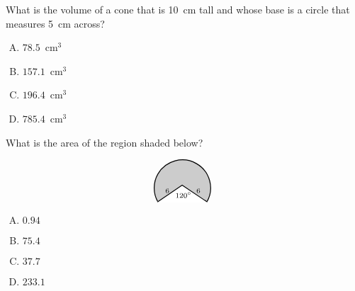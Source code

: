 \documentclass[12pt,letterpaper]{exam}
\begin{document}
\begin{questions}
\question What is the volume of a cone that is 10~cm tall and whose base is a circle that measures 5~cm across?
        \begin{enumerate}[A.]
        \item $78.5$~cm$^3$
        \item $157.1$~cm$^3$
        \item $196.4$~cm$^3$
        \item $785.4$~cm$^3$
        \end{enumerate}



\vfill



\question What is the area of the region shaded below?
	\[
	\begin{tikzpicture}
	\draw[line width=0.03cm,fill=gray!40] (0,0) arc (-30:210:1);
	\draw[line width=0.03cm,fill=white,white] (-1.75,0) -- (-0.875,0.6) -- (0.017,0) -- (-1.75,0);
	\draw[line width=0.03cm] (-1.75,0) -- (-0.875,0.6) -- (0.017,0);
	\node at (-0.3,0.4) {\scriptsize$6$};
	\node at (-1.4,0.4) {\scriptsize$6$};
	\node at (-0.83,0.25) {\scriptsize$120^\circ$};
	\end{tikzpicture}
	\]

\begin{enumerate}[A.]
\item $0.94$
\item $75.4$
\item $37.7$
\item $233.1$
\end{enumerate}


\end{questions}
\end{document}
